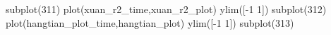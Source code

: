 subplot(311)
plot(xuan_r2_time,xuan_r2_plot)
ylim([-1 1])
subplot(312)
plot(hangtian_plot_time,hangtian_plot)
ylim([-1 1])
subplot(313)
